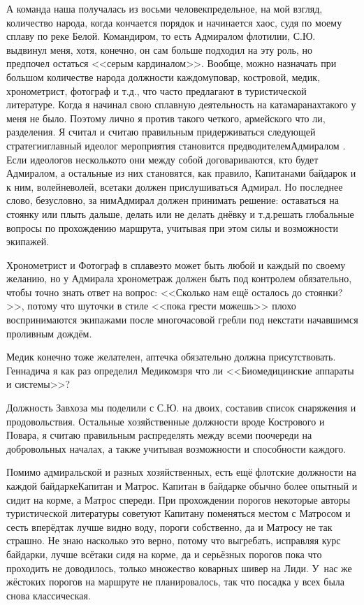А команда наша получалась из восьми человек\mdash предельное, на мой взгляд, количество народа, когда кончается порядок и начинается хаос, судя по моему сплаву по реке Белой. Командиром, то есть Адмиралом флотилии, С.Ю. выдвинул меня, хотя, конечно, он сам больше подходил на эту роль, но предпочел остаться <<серым кардиналом>>. Вообще, можно назначать при большом количестве народа должности каждому\mdash повар, костровой, медик, хронометрист, фотограф и т.д., что часто предлагают в туристической литературе. Когда я начинал свою сплавную деятельность на катамаранах\mdash такого у меня не было. Поэтому лично я против такого четкого, армейского что ли, разделения. Я считал и считаю правильным придерживаться следующей стратегии\mdash главный идеолог мероприятия становится предводителем\mdash Адмиралом \cite{Квадригин}. Если идеологов несколько\mdash то они между собой договариваются, кто будет Адмиралом, а остальные из них становятся, как правило, Капитанами байдарок и к ним, волей\sdash неволей, все\sdash таки должен прислушиваться Адмирал. Но последнее слово, безусловно, за ним\mdash Адмирал должен принимать решение: оставаться на стоянку или плыть дальше, делать или не делать днёвку и т.д.\mdash решать глобальные вопросы по прохождению маршрута, учитывая при этом силы и возможности экипажей.

Хронометрист и Фотограф в сплаве\mdash это может быть любой и каждый по своему желанию, но у Адмирала хронометраж должен быть под контролем обязательно, чтобы точно знать ответ на вопрос: <<Сколько нам ещё осталось до стоянки?>>, потому что шуточки в стиле <<пока грести можешь>> плохо воспринимаются экипажами после многочасовой гребли под некстати начавшимся проливным дождём. 

Медик конечно тоже желателен, аптечка обязательно должна присутствовать. Геннадича я как раз определил Медиком\mdash зря что ли <<Биомедицинские аппараты и системы>>? 

Должность Завхоза мы поделили с С.Ю. на двоих, составив список снаряжения и продовольствия. Остальные хозяйственные должности вроде Кострового и Повара, я считаю правильным распределять между всеми по\sdash очереди на добровольных началах, а также учитывая возможности и способности каждого. 

Помимо адмиральской и разных хозяйственных, есть ещё флотские должности на каждой байдарке\mdash Капитан и Матрос. Капитан в байдарке обычно более опытный и сидит на корме, а Матрос спереди. При прохождении порогов некоторые авторы туристической литературы советуют Капитану поменяться местом с Матросом и сесть вперёд\mdash так лучше видно воду, пороги собственно, да и Матросу не так страшно. Не знаю насколько это верно, потому что выгребать, исправляя курс байдарки, лучше всё\sdash таки сидя на корме, да и серьёзных порогов пока что проходить не доводилось, только множество коварных шивер на Лиди. У~нас же жёстоких порогов на маршруте не планировалось, так что посадка у всех была снова классическая. 

